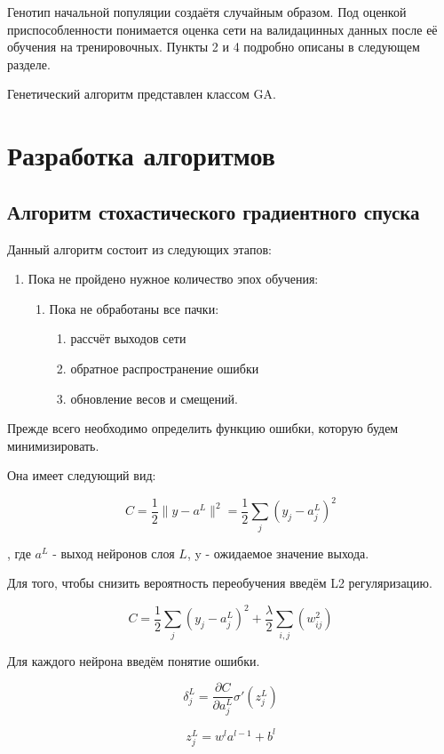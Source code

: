 \documentclass[a4paper,12pt]{article}
\begin{document}
Генотип начальной популяции создаётя случайным образом. Под оценкой приспособленности понимается оценка сети на валидацинных данных после её обучения на тренировочных. Пункты 2 и 4 подробно описаны в следующем разделе.

Генетический алгоритм представлен классом GA.

\newpage\section{Разработка алгоритмов}

\subsection{Алгоритм стохастического градиентного спуска}

Данный алгоритм состоит из следующих этапов:
\begin{enumerate}
\item Пока не пройдено нужное количество эпох обучения:
\begin{enumerate}
\item Пока не обработаны все пачки:
	\begin{enumerate}
	\item рассчёт выходов сети
	\item обратное распространение ошибки 
	\item обновление весов и смещений.
	\end{enumerate}
\end{enumerate}
\end{enumerate}

Прежде всего необходимо определить функцию ошибки, которую будем минимизировать.

Она имеет следующий вид:

{\large $$ C = \frac{1}{2} \|y-a^L\|^2 = \frac{1}{2} \sum_j (y_j-a^L_j)^2 $$}

, где $a^L$ - выход нейронов слоя $L$, y - ожидаемое значение выхода.

Для того, чтобы снизить вероятность переобучения введём L2 регуляризацию.

{\large $$ C = \frac{1}{2} \sum_j (y_j-a^L_j)^2 + \frac{\lambda}{2} \sum_{i,j} (w_{ij}^2)$$}

Для каждого нейрона введём понятие ошибки.

{\large $$ \delta^L_j = \frac{\partial C}{\partial a^L_j} \sigma'(z^L_j)$$}

{\large $$ z^L_j = w^{l} a^{l-1} + b^l$$}
\end{document}
